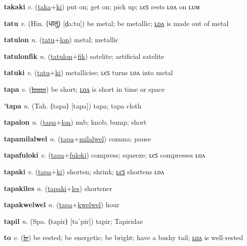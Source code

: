 \textbf{\hypertarget{takaki}{takaki}} \textit{v.} (\hyperlink{taka}{taka}+\allowbreak \hyperlink{ki}{ki})
put on; get on; pick up; ʟєꜱ rests ʟᴏᴧ on ʟᴜᴍ

\textbf{\hypertarget{tatu}{tatu}} \textit{v.} (Hin. ⟨{\devanagari{}धातु}⟩ [d̤aːtu])
be metal; be metallic; \hyperlink{tatulon}{ʟᴏᴧ} is made out of metal

\textbf{\hypertarget{tatulon}{tatulon}} \textit{n.} (\hyperlink{tatu}{tatu}+\allowbreak \hyperlink{lon}{lon})
metal; metallic

\textbf{\hypertarget{tatulonfik}{tatulonfik}} \textit{n.} (\hyperlink{tatulon}{tatulon}+\allowbreak \hyperlink{fik}{fik})
satelite; artificial satelite

\textbf{\hypertarget{tatuki}{tatuki}} \textit{v.} (\hyperlink{tatu}{tatu}+\allowbreak \hyperlink{ki}{ki})
metallicise; ʟєꜱ turns ʟᴏᴧ into metal

\textbf{\hypertarget{tapa}{tapa}} \textit{v.} (\hyperlink{lama}{\sout{lama}})
be short; \hyperlink{tapalon}{ʟᴏᴧ} is short in time or space

\textbf{\hypertarget{'tapa}{'tapa}} \textit{n.} (Tah. ⟨tapa⟩ [tapa])
tapa; tapa cloth

\textbf{\hypertarget{tapalon}{tapalon}} \textit{n.} (\hyperlink{tapa}{tapa}+\allowbreak \hyperlink{lon}{lon})
nub; knob; bump; short

\textbf{\hypertarget{tapamilalwel}{tapamilalwel}} \textit{n.} (\hyperlink{tapa}{tapa}+\allowbreak \hyperlink{milalwel}{milalwel})
comma; pause

\textbf{\hypertarget{tapafuloki}{tapafuloki}} \textit{v.} (\hyperlink{tapa}{tapa}+\allowbreak \hyperlink{fuloki}{fuloki})
compress; squeeze; ʟєꜱ compresses ʟᴏᴧ

\textbf{\hypertarget{tapaki}{tapaki}} \textit{v.} (\hyperlink{tapa}{tapa}+\allowbreak \hyperlink{ki}{ki})
shorten; shrink; \hyperlink{tapakiles}{ʟєꜱ} shortens ʟᴏᴧ

\textbf{\hypertarget{tapakiles}{tapakiles}} \textit{n.} (\hyperlink{tapaki}{tapaki}+\allowbreak \hyperlink{les}{les})
shortener

\textbf{\hypertarget{tapakwelwel}{tapakwelwel}} \textit{n.} (\hyperlink{tapa}{tapa}+\allowbreak \hyperlink{kwelwel}{kwelwel})
hour

\textbf{\hypertarget{tapil}{tapil}} \textit{n.} (Spa. ⟨tapir⟩ [taˈpir])
tapir; Tapiridae

\textbf{\hypertarget{to}{to}} \textit{v.} (\hyperlink{le}{\sout{le}})
be rested; be energetic; be bright; have a bushy tail; \hyperlink{tolon}{ʟᴏᴧ} is well-rested

